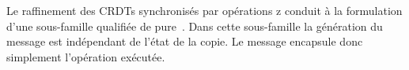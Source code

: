 Le raffinement des \acp{CRDT} synchronisés par opérations z conduit à la formulation d'une sous-famille qualifiée de pure~\autocite{baquero_2014_pure-op-crdt,baquero_2018_pure-op-crdt}.
Dans cette sous-famille la génération du message est indépendant de l'état de la copie.
Le message encapsule donc simplement l'opération exécutée.


